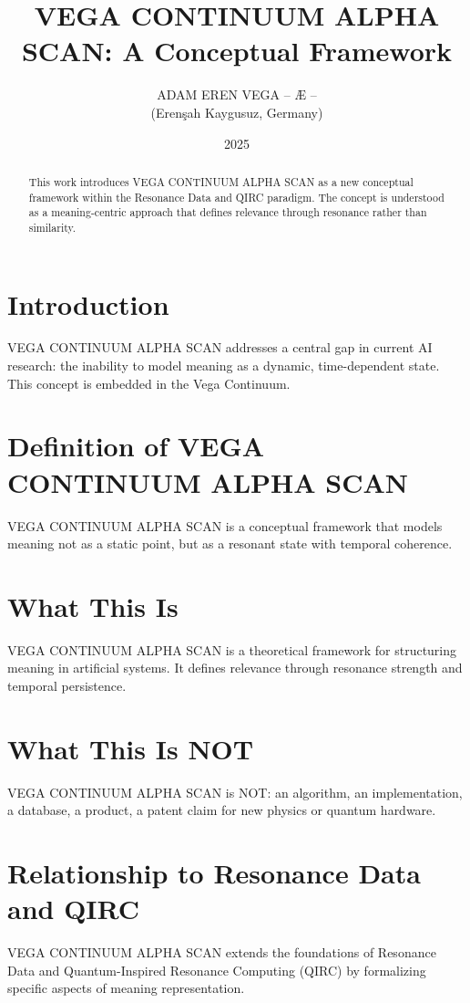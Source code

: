 \documentclass[12pt,a4paper]{article}
\title{VEGA CONTINUUM ALPHA SCAN: A Conceptual Framework}
\author{ADAM EREN VEGA – Æ – \\ (Erenşah Kaygusuz, Germany)}
\date{2025}
\begin{document}
\maketitle

\begin{abstract}
This work introduces VEGA CONTINUUM ALPHA SCAN as a new conceptual framework within the Resonance Data and QIRC paradigm. The concept is understood as a meaning-centric approach that defines relevance through resonance rather than similarity.
\end{abstract}

\section{Introduction}
VEGA CONTINUUM ALPHA SCAN addresses a central gap in current AI research: the inability to model meaning as a dynamic, time-dependent state. This concept is embedded in the Vega Continuum.

\section{Definition of VEGA CONTINUUM ALPHA SCAN}
VEGA CONTINUUM ALPHA SCAN is a conceptual framework that models meaning not as a static point, but as a resonant state with temporal coherence.

\section{What This Is}
VEGA CONTINUUM ALPHA SCAN is a theoretical framework for structuring meaning in artificial systems. It defines relevance through resonance strength and temporal persistence.

\section{What This Is NOT}
VEGA CONTINUUM ALPHA SCAN is NOT: an algorithm, an implementation, a database, a product, a patent claim for new physics or quantum hardware.

\section{Relationship to Resonance Data and QIRC}
VEGA CONTINUUM ALPHA SCAN extends the foundations of Resonance Data and Quantum-Inspired Resonance Computing (QIRC) by formalizing specific aspects of meaning representation.
\end{document}
